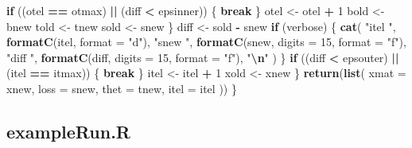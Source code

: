 \documentclass[
  12pt,
]{article}
\newenvironment{Shaded}{\begin{snugshade}}{\end{snugshade}}
\newcommand{\AttributeTok}[1]{\textcolor[rgb]{0.13,0.29,0.53}{#1}}
\newcommand{\ControlFlowTok}[1]{\textcolor[rgb]{0.13,0.29,0.53}{\textbf{#1}}}
\newcommand{\DecValTok}[1]{\textcolor[rgb]{0.00,0.00,0.81}{#1}}
\newcommand{\FunctionTok}[1]{\textcolor[rgb]{0.13,0.29,0.53}{\textbf{#1}}}
\newcommand{\NormalTok}[1]{#1}
\newcommand{\OtherTok}[1]{\textcolor[rgb]{0.56,0.35,0.01}{#1}}
\newcommand{\SpecialCharTok}[1]{\textcolor[rgb]{0.81,0.36,0.00}{\textbf{#1}}}
\newcommand{\StringTok}[1]{\textcolor[rgb]{0.31,0.60,0.02}{#1}}
\begin{document}
\begin{Shaded}
\begin{Highlighting}[]
        \ControlFlowTok{if}\NormalTok{ ((otel }\SpecialCharTok{==}\NormalTok{ otmax) }\SpecialCharTok{||}\NormalTok{ (diff }\SpecialCharTok{\textless{}}\NormalTok{ epsinner)) \{}
          \ControlFlowTok{break}
\NormalTok{        \}}
\NormalTok{        otel }\OtherTok{\textless{}{-}}\NormalTok{ otel }\SpecialCharTok{+} \DecValTok{1}
\NormalTok{        bold }\OtherTok{\textless{}{-}}\NormalTok{ bnew}
\NormalTok{        told }\OtherTok{\textless{}{-}}\NormalTok{ tnew}
\NormalTok{        sold }\OtherTok{\textless{}{-}}\NormalTok{ snew}
\NormalTok{      \}}
\NormalTok{      diff }\OtherTok{\textless{}{-}}\NormalTok{ sold }\SpecialCharTok{{-}}\NormalTok{ snew}
      \ControlFlowTok{if}\NormalTok{ (verbose) \{}
        \FunctionTok{cat}\NormalTok{(}
          \StringTok{"itel "}\NormalTok{,}
          \FunctionTok{formatC}\NormalTok{(itel, }\AttributeTok{format =} \StringTok{"d"}\NormalTok{),}
          \StringTok{"snew "}\NormalTok{,}
          \FunctionTok{formatC}\NormalTok{(snew, }\AttributeTok{digits =} \DecValTok{15}\NormalTok{, }\AttributeTok{format =} \StringTok{"f"}\NormalTok{),}
          \StringTok{"diff "}\NormalTok{,}
          \FunctionTok{formatC}\NormalTok{(diff, }\AttributeTok{digits =} \DecValTok{15}\NormalTok{, }\AttributeTok{format =} \StringTok{"f"}\NormalTok{),}
          \StringTok{"}\SpecialCharTok{\textbackslash{}n}\StringTok{"}
\NormalTok{        )}
\NormalTok{      \}}
      \ControlFlowTok{if}\NormalTok{ ((diff }\SpecialCharTok{\textless{}}\NormalTok{ epsouter) }\SpecialCharTok{||}\NormalTok{ (itel }\SpecialCharTok{==}\NormalTok{ itmax)) \{}
        \ControlFlowTok{break}
\NormalTok{      \}}
\NormalTok{      itel }\OtherTok{\textless{}{-}}\NormalTok{ itel }\SpecialCharTok{+} \DecValTok{1}
\NormalTok{      xold }\OtherTok{\textless{}{-}}\NormalTok{ xnew}
\NormalTok{    \}}
    \FunctionTok{return}\NormalTok{(}\FunctionTok{list}\NormalTok{(}
      \AttributeTok{xmat =}\NormalTok{ xnew,}
      \AttributeTok{loss =}\NormalTok{ snew,}
      \AttributeTok{thet =}\NormalTok{ tnew,}
      \AttributeTok{itel =}\NormalTok{ itel}
\NormalTok{    ))}
\NormalTok{  \}}
\end{Highlighting}
\end{Shaded}

\subsection{exampleRun.R}\label{examplerun.r}
\end{document}
